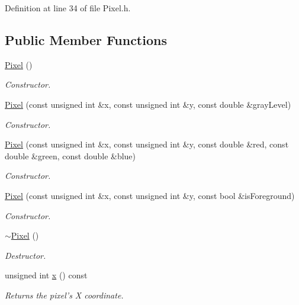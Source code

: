 Definition at line 34 of file Pixel.h.\subsection*{Public Member Functions}
\begin{CompactItemize}
\item 
\hyperlink{class_pixel_27ad99a2f705e635c42d242d530d4756}{Pixel} ()
\begin{CompactList}\small\item\em Constructor. \item\end{CompactList}\item 
\hyperlink{class_pixel_e54d95bf19847e4857eeb03f1138ceb9}{Pixel} (const unsigned int \&x, const unsigned int \&y, const double \&grayLevel)
\begin{CompactList}\small\item\em Constructor. \item\end{CompactList}\item 
\hyperlink{class_pixel_9fb3e8102469e8c2450e64815f5f6fb5}{Pixel} (const unsigned int \&x, const unsigned int \&y, const double \&red, const double \&green, const double \&blue)
\begin{CompactList}\small\item\em Constructor. \item\end{CompactList}\item 
\hyperlink{class_pixel_4657a977426649b6c56613971770fea6}{Pixel} (const unsigned int \&x, const unsigned int \&y, const bool \&isForeground)
\begin{CompactList}\small\item\em Constructor. \item\end{CompactList}\item 
\hyperlink{class_pixel_30f6aaf9a1d8792245070860546fa365}{$\sim$Pixel} ()
\begin{CompactList}\small\item\em Destructor. \item\end{CompactList}\item 
unsigned int \hyperlink{class_pixel_68dafccc4588fb33d445641c2766316b}{x} () const 
\begin{CompactList}\small\item\em Returns the pixel's X coordinate. \item\end{CompactList}\item 

\end{CompactItemize}

